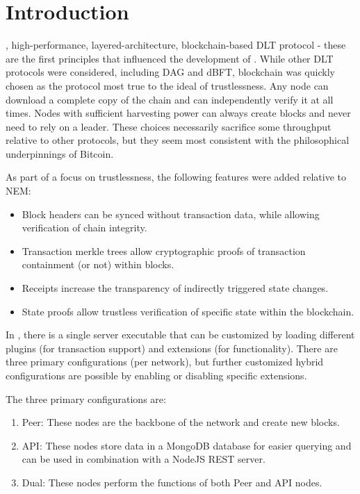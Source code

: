 \section{Introduction}
\label{sec:introduction}


, high-performance, layered-architecture, blockchain-based DLT protocol - these are the first principles that influenced the development of \codename.
While other DLT protocols were considered, including DAG and dBFT, blockchain was quickly chosen as the protocol most true to the ideal of trustlessness.
Any node can download a complete copy of the chain and can independently verify it at all times.
Nodes with sufficient harvesting power can always create blocks and never need to rely on a leader.
These choices necessarily sacrifice some throughput relative to other protocols, but they seem most consistent with the philosophical underpinnings of Bitcoin\cite{nakamoto2009}.

As part of a focus on trustlessness, the following features were added relative to NEM:
\begin{itemize}
	\item{Block headers can be synced without transaction data, while allowing verification of chain integrity.}
	\item{Transaction merkle trees allow cryptographic proofs of transaction containment (or not) within blocks.}
	\item{Receipts increase the transparency of indirectly triggered state changes.}
	\item{State proofs allow trustless verification of specific state within the blockchain.}
\end{itemize}

In \codename, there is a single server executable that can be customized by loading different plugins (for transaction support) and extensions (for functionality).
There are three primary configurations (per network), but further customized hybrid configurations are possible by enabling or disabling specific extensions.

The three primary configurations are:
\begin{enumerate}
	\item{Peer: These nodes are the backbone of the network and create new blocks.}
	\item{API: These nodes store data in a MongoDB database for easier querying and can be used in combination with a NodeJS REST server.}
	\item{Dual: These nodes perform the functions of both Peer and API nodes.}
\end{enumerate}

